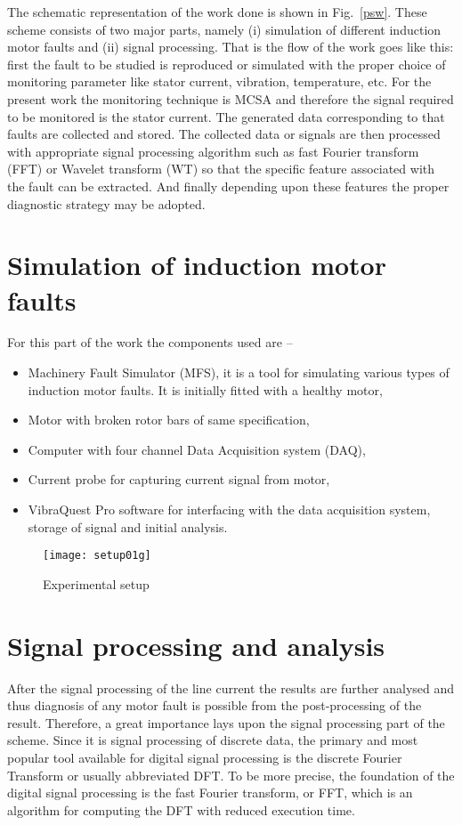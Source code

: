 \documentclass[a4paper,11pt]{report}
\begin{document}
The schematic representation of the work done is shown in Fig.~\ref{psw}. These scheme consists of two major parts, namely (i) simulation of different induction motor faults and (ii) signal processing. That is the flow of the work goes like this: first the fault to be studied is reproduced or simulated with the proper choice of monitoring parameter like stator current, vibration, temperature, etc. For the present work the monitoring technique is MCSA and therefore the signal required to be monitored is the stator current. The generated data corresponding to that faults are collected and stored. The collected data or signals are then processed with appropriate signal processing algorithm such as fast Fourier transform (FFT) or Wavelet transform (WT) so that the specific feature associated with the fault can be extracted. And finally depending upon these features the proper diagnostic strategy may be adopted. 

\section{Simulation of induction motor faults}
For this part of the work the components used are -- 
\begin{itemize}
\item Machinery Fault Simulator (MFS), it is a tool for simulating various types of induction motor faults. It is initially fitted with a healthy motor,
\item Motor with broken rotor bars of same specification,
\item Computer with four channel Data Acquisition system (DAQ),
\item Current probe for capturing current signal from motor,
\item VibraQuest Pro software for interfacing with the data acquisition system, storage of signal and initial analysis.
\end{itemize}

\begin{figure}[h]
\centering
\texttt{[image: setup01g]}
\caption{Experimental setup} \label{setup01g}
\end{figure}

\section{Signal processing and analysis}
After the signal processing of the line current the results are further analysed and thus diagnosis of any motor fault is possible from the post-processing of the result. Therefore, a great importance lays upon the signal processing part of the scheme. Since it is signal processing of discrete data, the primary and most popular tool available for digital signal processing is the discrete Fourier Transform or usually abbreviated DFT. To be more precise, the foundation of the digital signal processing is the fast Fourier transform, or FFT, which is an algorithm for computing the DFT with reduced execution time. 
\end{document}
